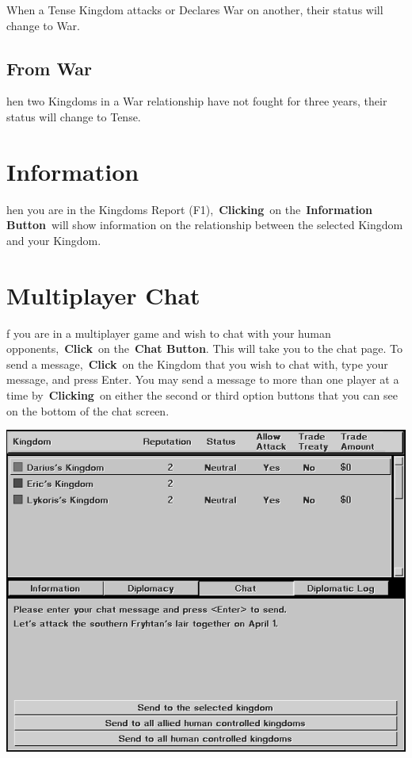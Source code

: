 When a Tense Kingdom attacks or Declares War on another, their status will change to War.

\subsection{From War}

hen two Kingdoms in a War relationship have not fought for three years, their status will change to Tense.

\section{Information}

hen you are in the Kingdoms Report (F1), \textbf{Clicking} on the \textbf{Information Button} will show information on the relationship between the selected Kingdom and your Kingdom.

\section{Multiplayer Chat}


f you are in a multiplayer game and wish to chat with your human opponents, \textbf{Click} on the \textbf{Chat Button}. This will take you to the chat page. To send a message, \textbf{Click} on the Kingdom that you wish to chat with, type your message, and press Enter. You may send a message to more than one player at a time by \textbf{Clicking} on either the second or third option buttons that you can see on the bottom of the chat screen.

\begin{center}
	\includegraphics[width=0.9\linewidth]{Imutlichat}
\end{center}

